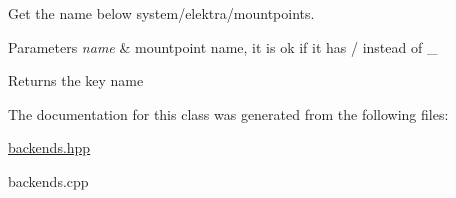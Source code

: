 Get the name below system/elektra/mountpoints. 


\begin{DoxyParams}{Parameters}
{\em name} & mountpoint name, it is ok if it has / instead of \-\_\-\\
\hline
\end{DoxyParams}
\begin{DoxyReturn}{Returns}
the key name 
\end{DoxyReturn}


The documentation for this class was generated from the following files\-:\begin{DoxyCompactItemize}
\item 
\hyperlink{backends_8hpp}{backends.\-hpp}\item 
backends.\-cpp\end{DoxyCompactItemize}
